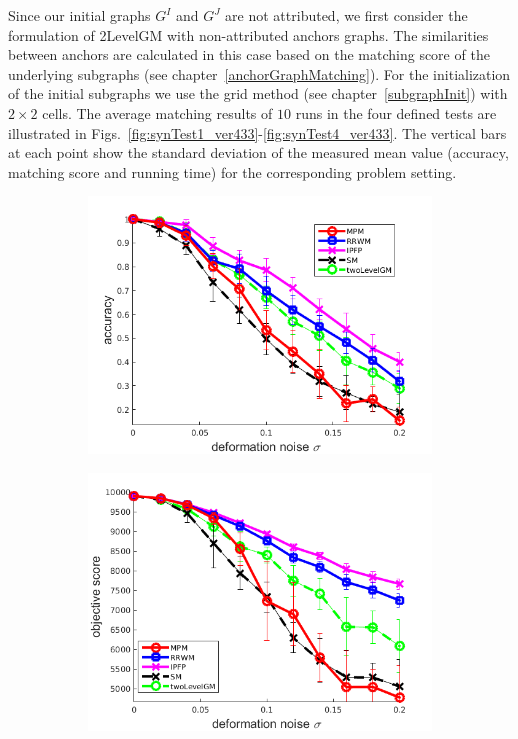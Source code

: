 Since our initial graphs $G^I$ and $G^J$ are not attributed, we first consider the formulation of 2LevelGM with non-attributed anchors graphs. The similarities between anchors are calculated in this case based on the matching score of the underlying subgraphs (see chapter~\ref{anchorGraphMatching}). For the initialization of the initial subgraphs we use the grid method (see chapter~\ref{subgraphInit}) with $2\times 2$ cells. The average matching results of $10$ runs in the four defined tests are illustrated in Figs.~\ref{fig:synTest1_ver433}-\ref{fig:synTest4_ver433}. The vertical bars at each point show the standard deviation of the measured mean value (accuracy, matching score and running time) for the corresponding problem setting.
\begin{figure}
	\begin{subfigure}[b]{0.33\textwidth}
		\centering
		\includegraphics[scale=0.25]{"chapter3/fig/SyntheticTest/no_descr/Results_v4.3.3/Test2/accuracy_avg10t"} 
	\end{subfigure}
	\begin{subfigure}[b]{0.33\textwidth}
		\centering
		\includegraphics[scale=0.25]{"chapter3/fig/SyntheticTest/no_descr/Results_v4.3.3/Test2/score_avg10t"} 

\end{subfigure}
\end{figure}
